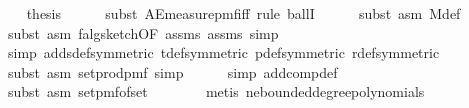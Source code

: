 \begin{isabellebody}
\ \ \isamarkupfalse%
\ {\isacharquery}{\kern0pt}thesis\isanewline
\ \ \ \ \isamarkupfalse%
\ {\isacharparenleft}{\kern0pt}subst\ AE{\isacharunderscore}{\kern0pt}measure{\isacharunderscore}{\kern0pt}pmf{\isacharunderscore}{\kern0pt}iff{\isacharcomma}{\kern0pt}\ rule\ ballI{\isacharparenright}{\kern0pt}\isanewline
\ \ \ \ \isamarkupfalse%
\ {\isacharparenleft}{\kern0pt}subst\ {\isacharparenleft}{\kern0pt}asm{\isacharparenright}{\kern0pt}\ M{\isacharunderscore}{\kern0pt}def{\isacharparenright}{\kern0pt}\isanewline
\ \ \ \ \isamarkupfalse%
\ {\isacharparenleft}{\kern0pt}subst\ {\isacharparenleft}{\kern0pt}asm{\isacharparenright}{\kern0pt}\ f{}{\isacharunderscore}{\kern0pt}alg{\isacharunderscore}{\kern0pt}sketch{\isacharbrackleft}{\kern0pt}OF\ assms{\isacharparenleft}{\kern0pt}{}{\isacharparenright}{\kern0pt}\ assms{\isacharparenleft}{\kern0pt}{}{\isacharparenright}{\kern0pt}{\isacharbrackright}{\kern0pt}{\isacharcomma}{\kern0pt}\ simp{\isacharparenright}{\kern0pt}\isanewline
\ \ \ \ \isamarkupfalse%
\ {\isacharparenleft}{\kern0pt}simp\ add{\isacharcolon}{\kern0pt}s{\isacharunderscore}{\kern0pt}def{\isacharbrackleft}{\kern0pt}symmetric{\isacharbrackright}{\kern0pt}\ t{\isacharunderscore}{\kern0pt}def{\isacharbrackleft}{\kern0pt}symmetric{\isacharbrackright}{\kern0pt}\ p{\isacharunderscore}{\kern0pt}def{\isacharbrackleft}{\kern0pt}symmetric{\isacharbrackright}{\kern0pt}\ r{\isacharunderscore}{\kern0pt}def{\isacharbrackleft}{\kern0pt}symmetric{\isacharbrackright}{\kern0pt}{\isacharparenright}{\kern0pt}\isanewline
\ \ \ \ \isamarkupfalse%
\ {\isacharparenleft}{\kern0pt}subst\ {\isacharparenleft}{\kern0pt}asm{\isacharparenright}{\kern0pt}\ set{\isacharunderscore}{\kern0pt}prod{\isacharunderscore}{\kern0pt}pmf{\isacharcomma}{\kern0pt}\ simp{\isacharparenright}{\kern0pt}\isanewline
\ \ \ \ \isamarkupfalse%
\ {\isacharparenleft}{\kern0pt}simp\ add{\isacharcolon}{\kern0pt}comp{\isacharunderscore}{\kern0pt}def{\isacharparenright}{\kern0pt}\isanewline
\ \ \ \ \isamarkupfalse%
\ {\isacharparenleft}{\kern0pt}subst\ {\isacharparenleft}{\kern0pt}asm{\isacharparenright}{\kern0pt}\ set{\isacharunderscore}{\kern0pt}pmf{\isacharunderscore}{\kern0pt}of{\isacharunderscore}{\kern0pt}set{\isacharparenright}{\kern0pt}\isanewline
\ \ \ \ \ \ \isamarkupfalse%
\ {\isacharparenleft}{\kern0pt}metis\ ne{\isacharunderscore}{\kern0pt}bounded{\isacharunderscore}{\kern0pt}degree{\isacharunderscore}{\kern0pt}polynomials{\isacharparenright}{\kern0pt}\isanewline

\end{isabellebody}
